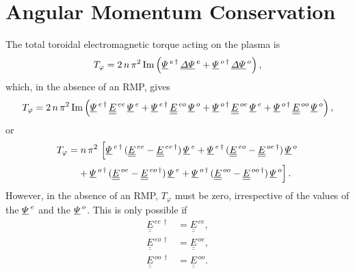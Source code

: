 \documentclass[12pt,prb,aps,notitlepage]{revtex4-1}
\begin{document}
\section{Angular Momentum Conservation}
The total toroidal electromagnetic torque acting on the plasma
is
\begin{equation}
T_\varphi = 2\,n\,\pi^2\,{\rm Im}\left(\underline{\mit\Psi}^{\,e\,\dag} \,\underline{\mit\Delta\Psi}^{\,e} +\underline{\mit\Psi}^{\,o\,\dag} \,\underline{\mit\Delta\Psi}^{\,o}\right),
\end{equation}
which, in the absence of an RMP, gives
\begin{equation}
T_\varphi = 2\,n\,\pi^2\,{\rm Im}\left(\underline{\mit\Psi}^{\,e\,\dag}\,\underline{\underline{E}}^{\,ee}  \,\underline{\mit\Psi}^{\,e}+\underline{\mit\Psi}^{\,e\,\dag}\,\underline{\underline{E}}^{\,eo}  \,\underline{\mit\Psi}^{\,o}
+ \underline{\mit\Psi}^{\,o\,\dag}\,\underline{\underline{E}}^{\,oe}  \,\underline{\mit\Psi}^{\,e}+\underline{\mit\Psi}^{\,o\,\dag}\,\underline{\underline{E}}^{\,oo}  \,\underline{\mit\Psi}^{\,o}\right),
\end{equation}
or
\begin{align}
T_\varphi &= n\,\pi^2\,\left[\underline{\mit\Psi}^{\,e\,\dag}\,(\underline{\underline{E}}^{\,ee}-  \underline{\underline{E}}^{\,ee\,\dag})\,\underline{\mit\Psi}^{\,e}+\underline{\mit\Psi}^{\,e\,\dag}\,(\underline{\underline{E}}^{\,eo}-  \underline{\underline{E}}^{\,oe\,\dag})\,\underline{\mit\Psi}^{\,o}\right.\nonumber\\[0.5ex]
&\left.\phantom{=}+\underline{\mit\Psi}^{\,o\,\dag}\,(\underline{\underline{E}}^{\,oe}-  \underline{\underline{E}}^{\,eo\,\dag})\,\underline{\mit\Psi}^{\,e}+ \underline{\mit\Psi}^{\,o\,\dag}\,(\underline{\underline{E}}^{\,oo}-  \underline{\underline{E}}^{\,oo\,\dag})\,\underline{\mit\Psi}^{\,o}\right].
\end{align}
However, in the absence of an RMP,  $T_\varphi$ must be zero, irrespective of the values of the $\underline{\mit\Psi}^{\,e}$ and the $\underline{\mit\Psi}^{\,o}$. This is only possible if
\begin{align}
\underline{\underline{E}}^{\,ee\,\dag} &=\underline{\underline{E}}^{\,ee},\\[0.5ex]
\underline{\underline{E}}^{\,eo\,\dag} &=\underline{\underline{E}}^{\,oe},\\[0.5ex]
\underline{\underline{E}}^{\,oo\,\dag} &=\underline{\underline{E}}^{\,oo}.
\end{align}
\end{document}

